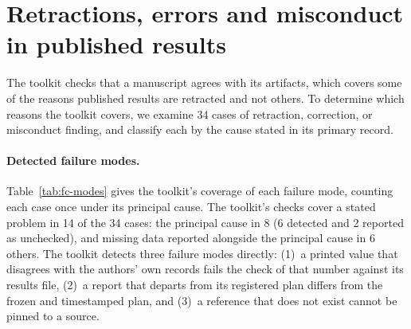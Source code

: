
\section{Retractions, errors and misconduct in published results}
\label{sec:failure-cases}

The toolkit checks that a manuscript agrees with its artifacts, which covers some of the
reasons published results are retracted and not others. To determine which reasons the toolkit
covers, we examine 34 cases of retraction, correction, or misconduct finding, and classify each
by the cause stated in its primary record.

\paragraph{Detected failure modes.} Table~\ref{tab:fc-modes} gives the toolkit's coverage of
each failure mode, counting each case once under its principal cause. The toolkit's checks
cover a stated problem in 14 of the 34 cases: the principal cause in 8 (6 detected and 2
reported as unchecked), and missing data reported
alongside the principal cause in 6 others. The toolkit detects three failure modes directly: (1)~a printed value that
disagrees with the authors' own records fails the check of that number against its results
file, (2)~a report that departs from its registered plan differs from the frozen and
timestamped plan, and (3)~a reference that does not exist cannot be pinned to a source.

